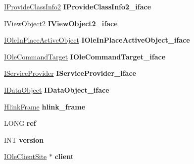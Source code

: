 \begin{DoxyCompactItemize}
\hyperlink{interface_i_provide_class_info2}{I\+Provide\+Class\+Info2} {\bfseries I\+Provide\+Class\+Info2\+\_\+iface}
\item 
\mbox{\label{struct_web_browser_a00865a34d470405c55ff97b68ca1e940}} 
\hyperlink{interface_i_view_object2}{I\+View\+Object2} {\bfseries I\+View\+Object2\+\_\+iface}
\item 
\mbox{\label{struct_web_browser_aadba498e55c49ac6657059f874edb35d}} 
\hyperlink{interface_i_ole_in_place_active_object}{I\+Ole\+In\+Place\+Active\+Object} {\bfseries I\+Ole\+In\+Place\+Active\+Object\+\_\+iface}
\item 
\mbox{\label{struct_web_browser_a6bbb600b9ad89d33b071db01eef69998}} 
\hyperlink{interface_i_ole_command_target}{I\+Ole\+Command\+Target} {\bfseries I\+Ole\+Command\+Target\+\_\+iface}
\item 
\mbox{\label{struct_web_browser_a628edae64f431c5fecaba4ca57cc5a08}} 
\hyperlink{interface_i_service_provider}{I\+Service\+Provider} {\bfseries I\+Service\+Provider\+\_\+iface}
\item 
\mbox{\label{struct_web_browser_aa43fade2acb40879825c6f35ced7cf8d}} 
\hyperlink{interface_i_data_object}{I\+Data\+Object} {\bfseries I\+Data\+Object\+\_\+iface}
\item 
\mbox{\label{struct_web_browser_a569ae772e63f32a82ed9897d6998dbad}} 
\hyperlink{struct_hlink_frame}{Hlink\+Frame} {\bfseries hlink\+\_\+frame}
\item 
\mbox{\label{struct_web_browser_a3065ef8d5f57f01d6c9f64a54370f0bc}} 
L\+O\+NG {\bfseries ref}
\item 
\mbox{\label{struct_web_browser_a4fffdc4487a6ac1d82f0b81fb55ca613}} 
I\+NT {\bfseries version}
\item 
\mbox{\label{struct_web_browser_a9524cff31bcd7aac157bb996e08b91d4}} 
\hyperlink{interface_i_ole_client_site}{I\+Ole\+Client\+Site} $\ast$ {\bfseries client}
\item 
\mbox{\label{struct_web_browser_a565ff1f6e18e18156cf59cbeeb99e6eb}} 

\end{DoxyCompactItemize}

